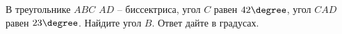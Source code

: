\begin{ex}
	\begin{condition}
		В треугольнике \( ABC \) \( AD \) – биссектриса, угол \( C \) равен \( 42\degree \), угол \( CAD \) равен \( 23 \degree\). Найдите угол \( B \). Ответ дайте в градусах.
	\end{condition}
\end{ex}
